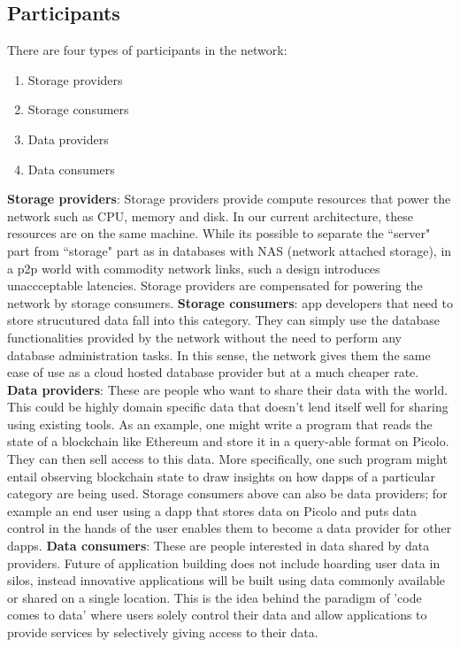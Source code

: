 \subsection{Participants} \label{sec:participants}
There are four types of participants in the network:
\begin{enumerate}
	\item Storage providers
	\item Storage consumers
	\item Data providers
	\item Data consumers \newline
\end{enumerate}
\textbf{Storage providers}: Storage providers provide compute resources that power the network such as CPU, memory and disk. In our current architecture, these resources are on the same machine. While its possible to separate the ``server" part from ``storage" part as in databases with NAS (network attached storage), in a p2p world with commodity network links, such a design introduces unaccceptable latencies. Storage providers are compensated for powering the network by storage consumers. 
\newline\newline
\textbf{Storage consumers}: \DJ app developers that need to store strucutured data fall into this category. They can simply use the database functionalities provided by the network without the need to perform any database administration tasks. In this sense, the network gives them the same ease of use as a cloud hosted database provider but at a much cheaper rate.
\newline\newline
\textbf{Data providers}: These are people who want to share their data with the world. This could be highly domain specific data that doesn't lend itself well for sharing using existing tools. As an example, one might write a program that reads the state of a blockchain like Ethereum and store it in a query-able format on Picolo. They can then sell access to this data. More specifically, one such program might entail observing blockchain state to draw insights on how dapps of a particular category are being used. Storage consumers above can also be data providers; for example an end user using a dapp that stores data on Picolo and puts data control in the hands of the user enables them to become a data provider for other dapps. 
\newline\newline
\textbf{Data consumers}: These are people interested in data shared by data providers. Future of application building does not include hoarding user data in silos, instead innovative applications will be built using data commonly available or shared on a single location. This is the idea behind the paradigm of 'code comes to data' where users solely control their data and allow applications to provide services by selectively giving access to their data.


